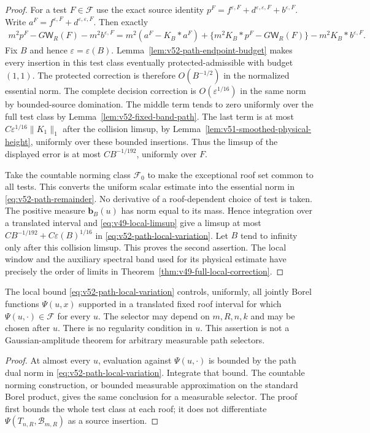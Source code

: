 \begin{proof}
For a test $F\in\mathcal F$ use the exact source identity
$p^F=f^{\varepsilon,F}+d^{\varepsilon,\varepsilon,F}
+b^{\varepsilon,F}$. Write $a^F=f^{\varepsilon,F}
+d^{\varepsilon,\varepsilon,F}$. Then exactly
\begin{align*}
 m^2p^F-G\mathsf W_R(F)-m^2b^{\varepsilon,F}
  =m^2(a^F-K_B*a^F)
   +\{m^2K_B*p^F-G\mathsf W_R(F)\}
   -m^2K_B*b^{\varepsilon,F}.
\end{align*}
Fix $B$ and hence $\varepsilon=\varepsilon(B)$.
Lemma~\ref{lem:v52-path-endpoint-budget} makes every insertion in
this test class eventually protected-admissible with budget $(1,1)$.
The protected correction is therefore $O(B^{-1/2})$ in the normalized
essential norm. The complete decision correction is
$O(\varepsilon^{1/16})$ in the same norm by bounded-source domination.
The middle term tends to zero uniformly over the full test class by
Lemma~\ref{lem:v52-fixed-band-path}. The last term is at most
$C\varepsilon^{1/16}\|K_1\|_1$ after the collision limsup, by
Lemma~\ref{lem:v51-smoothed-physical-height}, uniformly over these
bounded insertions. Thus the limsup of the displayed error is at most
$CB^{-1/192}$, uniformly over $F$.

Take the countable norming class $\mathcal F_0$ to make the exceptional
roof set common to all tests. This converts the uniform scalar
estimate into the essential norm in \eqref{eq:v52-path-remainder}.
No derivative of a roof-dependent choice of test is taken.
The positive measure $\mathbf b_B(u)$ has norm equal to its mass.
Hence integration over a translated interval and
\eqref{eq:v49-local-limsup} give a limsup at most
$CB^{-1/192}+C\varepsilon(B)^{1/16}$ in
\eqref{eq:v52-path-local-variation}. Let $B$ tend to infinity only
after this collision limsup. This proves the second assertion.
The local window and the auxiliary spectral band used for its
physical estimate have precisely the order of limits in
Theorem~\ref{thm:v49-full-local-correction}.
\end{proof}

\begin{corollary}
\label{cor:v52-roof-path-selectors}
The local bound \eqref{eq:v52-path-local-variation} controls, uniformly,
all jointly Borel functions $\Psi(u,x)$ supported in a translated fixed
roof interval for which $\Psi(u,\cdot)\in\mathcal F$ for every $u$.
The selector may depend on $m,R,n,k$ and may be chosen after $u$.
There is no regularity condition in $u$. This assertion is not a
Gaussian-amplitude theorem for arbitrary measurable path selectors.
\end{corollary}
\begin{proof}
At almost every $u$, evaluation against $\Psi(u,\cdot)$ is bounded
by the path dual norm in \eqref{eq:v52-path-local-variation}.
Integrate that bound. The countable norming construction, or bounded
measurable approximation on the standard Borel product, gives the
same conclusion for a measurable selector. The proof first bounds
the whole test class at each roof; it does not differentiate
$\Psi(T_{n,R},\mathcal B_{m,R})$ as a source insertion.
\end{proof}

